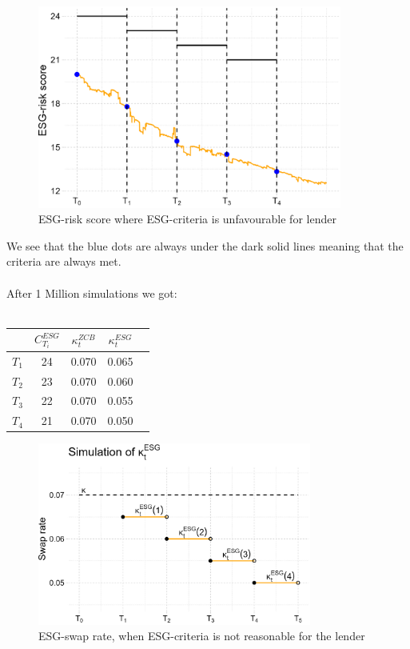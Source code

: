 \begin{figure}[htp]
    \centering
    \includegraphics[width= 10cm]{figures/ESG/ESG_plt_criteria2.png}
    \caption{ESG-risk score where ESG-criteria is unfavourable for lender}
    \label{fig: ESG_risk_criteria_2}
\end{figure}

We see that the blue dots are always under the dark solid lines meaning that the criteria are always met.
\\~\\ 
After 1 Million simulations we got:
\\~\\
\begin{center}
\begin{tabular}{lcccl}
\toprule
           &$C_{T_{i}}^{ESG}$ & $\kappa_{t}^{ZCB}$  & $\kappa_{t}^{ESG}$ \\
\midrule
$T_{1}$ &  24 & 0.070 & 0.065 \\
$T_{2}$ &  23 & 0.070 & 0.060 \\
$T_{3}$ &  22 & 0.070 & 0.055 \\
$T_{4}$ &  21 & 0.070 & 0.050 \\
\bottomrule
\end{tabular}
\end{center}


\begin{figure}[htp]
    \centering
    \includegraphics[width= 9cm]{figures/ESG/kappa_t_ESG_2.png}
    \caption{ESG-swap rate, when ESG-criteria is not reasonable for the lender}
    \label{fig: ESG_swap_2}
\end{figure}

